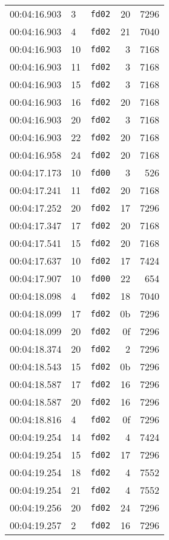 \documentclass{article}
\begin{document}
\begin{longtable}{lllrr}
00:04:16.903 & 3 & \texttt{fd02} & 20 & 7296 \\
00:04:16.903 & 4 & \texttt{fd02} & 21 & 7040 \\
00:04:16.903 & 10 & \texttt{fd02} & 3 & 7168 \\
00:04:16.903 & 11 & \texttt{fd02} & 3 & 7168 \\
00:04:16.903 & 15 & \texttt{fd02} & 3 & 7168 \\
00:04:16.903 & 16 & \texttt{fd02} & 20 & 7168 \\
00:04:16.903 & 20 & \texttt{fd02} & 3 & 7168 \\
00:04:16.903 & 22 & \texttt{fd02} & 20 & 7168 \\
00:04:16.958 & 24 & \texttt{fd02} & 20 & 7168 \\
00:04:17.173 & 10 & \texttt{fd00} & 3 & 526 \\
00:04:17.241 & 11 & \texttt{fd02} & 20 & 7168 \\
00:04:17.252 & 20 & \texttt{fd02} & 17 & 7296 \\
00:04:17.347 & 17 & \texttt{fd02} & 20 & 7168 \\
00:04:17.541 & 15 & \texttt{fd02} & 20 & 7168 \\
00:04:17.637 & 10 & \texttt{fd02} & 17 & 7424 \\
00:04:17.907 & 10 & \texttt{fd00} & 22 & 654 \\
00:04:18.098 & 4 & \texttt{fd02} & 18 & 7040 \\
00:04:18.099 & 17 & \texttt{fd02} & 0b & 7296 \\
00:04:18.099 & 20 & \texttt{fd02} & 0f & 7296 \\
00:04:18.374 & 20 & \texttt{fd02} & 2 & 7296 \\
00:04:18.543 & 15 & \texttt{fd02} & 0b & 7296 \\
00:04:18.587 & 17 & \texttt{fd02} & 16 & 7296 \\
00:04:18.587 & 20 & \texttt{fd02} & 16 & 7296 \\
00:04:18.816 & 4 & \texttt{fd02} & 0f & 7296 \\
00:04:19.254 & 14 & \texttt{fd02} & 4 & 7424 \\
00:04:19.254 & 15 & \texttt{fd02} & 17 & 7296 \\
00:04:19.254 & 18 & \texttt{fd02} & 4 & 7552 \\
00:04:19.254 & 21 & \texttt{fd02} & 4 & 7552 \\
00:04:19.256 & 20 & \texttt{fd02} & 24 & 7296 \\
00:04:19.257 & 2 & \texttt{fd02} & 16 & 7296 \\

\end{longtable}
\end{document}
